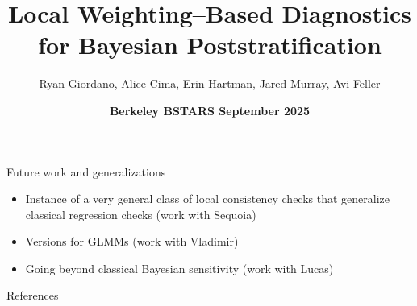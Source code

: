 \documentclass[8pt]{beamer}\usepackage[]{graphicx}\usepackage[]{color}
\title{Local Weighting--Based Diagnostics for Bayesian Poststratification}
\author{Ryan Giordano, Alice Cima, Erin Hartman, Jared Murray, Avi Feller}
\date{\textbf{Berkeley BSTARS September 2025}}
\begin{document}
\maketitle














\begin{frame}{Future work and generalizations}
%
\begin{itemize}
    \item Instance of a very general class of local consistency checks that generalize
          classical regression checks (work with Sequoia)
    \item Versions for GLMMs (work with Vladimir)
    \item Going beyond classical Bayesian sensitivity (work with Lucas)
\end{itemize}
%
\end{frame}




\begin{frame}{References}

\footnotesize

% 
% 

\printbibliography

\end{frame}
\end{document}
